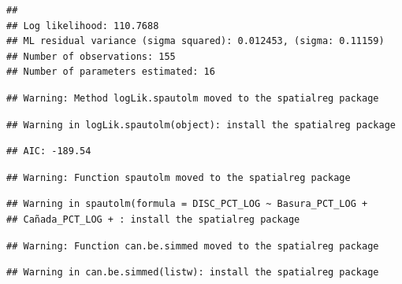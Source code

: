 \documentclass[11pt,]{article}
\newenvironment{Shaded}{\begin{snugshade}}{\end{snugshade}}
\newcommand{\KeywordTok}[1]{\textcolor[rgb]{0.13,0.29,0.53}{\textbf{#1}}}
\newcommand{\DataTypeTok}[1]{\textcolor[rgb]{0.13,0.29,0.53}{#1}}
\newcommand{\StringTok}[1]{\textcolor[rgb]{0.31,0.60,0.02}{#1}}
\newcommand{\OperatorTok}[1]{\textcolor[rgb]{0.81,0.36,0.00}{\textbf{#1}}}
\newcommand{\NormalTok}[1]{#1}
\begin{document}
\begin{verbatim}
## 
## Log likelihood: 110.7688 
## ML residual variance (sigma squared): 0.012453, (sigma: 0.11159)
## Number of observations: 155 
## Number of parameters estimated: 16
\end{verbatim}

\begin{verbatim}
## Warning: Method logLik.spautolm moved to the spatialreg package
\end{verbatim}

\begin{verbatim}
## Warning in logLik.spautolm(object): install the spatialreg package
\end{verbatim}

\begin{verbatim}
## AIC: -189.54
\end{verbatim}

\begin{Shaded}
\end{Shaded}

\begin{verbatim}
## Warning: Function spautolm moved to the spatialreg package
\end{verbatim}

\begin{verbatim}
## Warning in spautolm(formula = DISC_PCT_LOG ~ Basura_PCT_LOG +
## Cañada_PCT_LOG + : install the spatialreg package
\end{verbatim}

\begin{verbatim}
## Warning: Function can.be.simmed moved to the spatialreg package
\end{verbatim}

\begin{verbatim}
## Warning in can.be.simmed(listw): install the spatialreg package
\end{verbatim}
\end{document}
